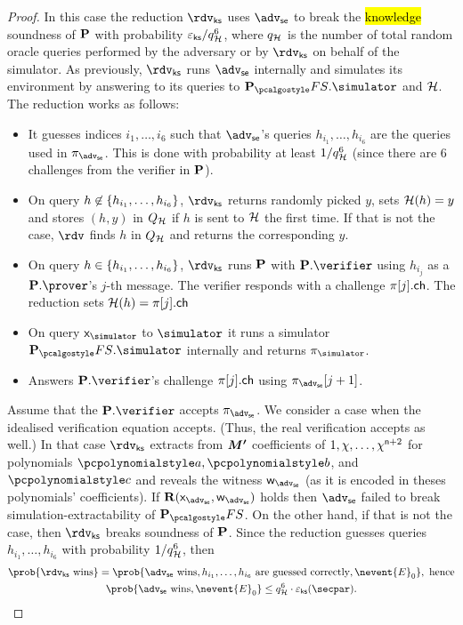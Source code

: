 \documentclass[runningheads,11pt]{llncs}
\let\spvec\vec
\let\vec\accentvec
\let\vec\spvec
\def\vec#1{\mathchoice{\mbox{\boldmath$\displaystyle#1$}}
	{\mbox{\boldmath$\textstyle#1$}}
	{\mbox{\boldmath$\scriptstyle#1$}}
	{\mbox{\boldmath$\scriptscriptstyle#1$}}}
\theoremstyle{definition}
\begin{document}
\begin{proof}
In this case the reduction $\rdvks$ uses $\advse$ to break the \hl{knowledge} soundness of $\mathbf{P}$ with probability $\varepsilon_{\mathsf{ks}} / q_{\mathcal{H}}^6$, where $q_{\mathcal{H}}$ is the number of total random oracle queries performed by the adversary or by $\rdvks$ on behalf of the simulator.
As previously, $\rdvks$ runs $\advse$ internally and simulates its environment by answering to its queries to $\plonkprotfs.\simulator$ and $\mathcal{H}$. The reduction works as follows:
\begin{itemize}
	\item It guesses indices $i_1, \ldots, i_6$ such that $\advse$'s queries $h_{i_1}, \ldots, h_{i_6}$ are the queries used in $\zkproof_\advse$. This is done with probability at least $1/q_{\mathcal{H}}^6$ (since there are $6$ challenges from the verifier in $\mathbf{P}$).
	\item On query $h \not\in \{h_{i_1}, \ldots, h_{i_6}\}$, $\rdvks$ returns randomly picked $y$, sets $\mathcal{H}(h) = y $ and stores $(h, y)$ in $Q_{\mathcal{H}}$ if $h$ is sent to $\mathcal{H}$ the first time. If that is not the case, $\rdv$ finds $h$ in $Q_{\mathcal{H}}$ and returns the corresponding $y$.
	\item On query $h \in \{h_{i_1}, \ldots, h_{i_6}\}$, $\rdvks$ runs $\mathbf{P}$ with $\plonkprot.\verifier$ using $h_{i_j}$ as a $\plonkprot.\prover$'s $j$-th message. The verifier responds with a challenge $\pi[j].\mathsf{ch}$. The reduction sets $\mathcal{H}(h) = \pi[j].\mathsf{ch}$
	\item On query $\inp_\simulator$ to $\simulator$ it runs a simulator $\plonkprotfs.\simulator$ internally and returns $\zkproof_\simulator$.
	\item Answers $\plonkprot.\verifier$'s challenge $\pi[j].\mathsf{ch}$ using $\zkproof_\advse[j + 1]$.
\end{itemize}

Assume that the $\plonkprot.\verifier$ accepts $\zkproof_\advse$. We consider a case when the idealised verification equation accepts. (Thus, the real verification accepts as well.) 
In that case $\rdvks$ extracts from $\vec{M'}$ coefficients of $1, \chi, \ldots, \chi^{\mathsf{n} + 2}$ for polynomials $\p{a}, \p{b}$, and $\p{c}$ and reveals the witness $\wit_\advse$ (as it is encoded in theses polynomials' coefficients).
If $\REL(\inp_\advse, \wit_\advse)$ holds then $\advse$ failed to break simulation-extractability of $\plonkprotfs$. On the other hand, if that is not the case, then $\rdvks$ breaks soundness of $\mathbf{P}$.
%
Since the reduction guesses queries $h_{i_1}, \ldots, h_{i_6}$ with probability $1/q_{\mathcal{H}}^6$, then 
\begin{gather*}
	\prob{\rdvks \text{ wins}} = \prob{\advse \text{ wins}, h_{i_1}, \ldots, h_{i_6} \text{ are guessed correctly}, \nevent{E}_0}, \text{ hence}\\
	\prob{\advse \text{ wins}, \nevent{E}_0} \leq q_\ro^6 \cdot \eps_{\ks}(\secpar).
\end{gather*}


\end{proof}
\end{document}
